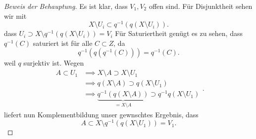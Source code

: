 \begin{proof}[Beweis der Behauptung]
    Es ist klar, dass $V_1, V_2$ offen sind. Für Disjunktheit sehen wir mit
    \[
        X \setminus U_i \subset  q^{-1}(q(X\setminus U_i))
    .\] 
    dass $U_i \supset X \setminus q^{-1}(q(X\setminus U_i)) = V_i$ 
    Für Saturiertheit genügt es zu sehen, dass $q^{-1}(C)$ saturiert ist für alle $C\subset Z$, da
    \[
        q^{-1}(q(q^{-1}(C))) = q^{-1}(C)
    .\] 
    weil $q$ surjektiv ist. Wegen
     \[
         \begin{split}
             A\subset U_1 &\implies X \setminus A \supset X \setminus U_1 \\ &\implies q(X\setminus A) \supset q(X\setminus U_1)\\ &\implies \underbrace{q^{-1}(q(X\setminus A))}_{=X\setminus A} \supset q^{-1}q(X\setminus U_1)
         \end{split}
    .\]
    liefert nun Komplementbildung unser gewnschtes Ergebnis, dass
    \[
        A \subset  X \setminus q^{-1}(q(X\setminus U_1)) = V_1
    .\] 
\end{proof}


